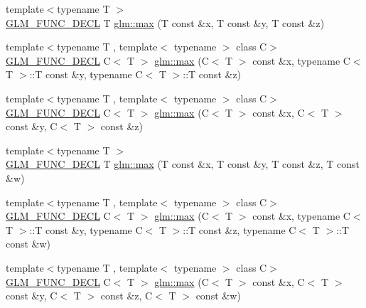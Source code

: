 \begin{DoxyCompactItemize}
\item 
{\footnotesize template$<$typename T $>$ }\\\hyperlink{setup_8hpp_ab2d052de21a70539923e9bcbf6e83a51}{G\+L\+M\+\_\+\+F\+U\+N\+C\+\_\+\+D\+E\+CL} T \hyperlink{group__gtx__extented__min__max_ga04991ccb9865c4c4e58488cfb209ce69}{glm\+::max} (T const \&x, T const \&y, T const \&z)
\item 
{\footnotesize template$<$typename T , template$<$ typename $>$ class C$>$ }\\\hyperlink{setup_8hpp_ab2d052de21a70539923e9bcbf6e83a51}{G\+L\+M\+\_\+\+F\+U\+N\+C\+\_\+\+D\+E\+CL} C$<$ T $>$ \hyperlink{group__gtx__extented__min__max_gae1b7bbe5c91de4924835ea3e14530744}{glm\+::max} (C$<$ T $>$ const \&x, typename C$<$ T $>$\+::T const \&y, typename C$<$ T $>$\+::T const \&z)
\item 
{\footnotesize template$<$typename T , template$<$ typename $>$ class C$>$ }\\\hyperlink{setup_8hpp_ab2d052de21a70539923e9bcbf6e83a51}{G\+L\+M\+\_\+\+F\+U\+N\+C\+\_\+\+D\+E\+CL} C$<$ T $>$ \hyperlink{group__gtx__extented__min__max_gaf832e9d4ab4826b2dda2fda25935a3a4}{glm\+::max} (C$<$ T $>$ const \&x, C$<$ T $>$ const \&y, C$<$ T $>$ const \&z)
\item 
{\footnotesize template$<$typename T $>$ }\\\hyperlink{setup_8hpp_ab2d052de21a70539923e9bcbf6e83a51}{G\+L\+M\+\_\+\+F\+U\+N\+C\+\_\+\+D\+E\+CL} T \hyperlink{group__gtx__extented__min__max_ga78e04a0cef1c4863fcae1a2130500d87}{glm\+::max} (T const \&x, T const \&y, T const \&z, T const \&w)
\item 
{\footnotesize template$<$typename T , template$<$ typename $>$ class C$>$ }\\\hyperlink{setup_8hpp_ab2d052de21a70539923e9bcbf6e83a51}{G\+L\+M\+\_\+\+F\+U\+N\+C\+\_\+\+D\+E\+CL} C$<$ T $>$ \hyperlink{group__gtx__extented__min__max_ga7cca8b53cfda402040494cdf40fbdf4a}{glm\+::max} (C$<$ T $>$ const \&x, typename C$<$ T $>$\+::T const \&y, typename C$<$ T $>$\+::T const \&z, typename C$<$ T $>$\+::T const \&w)
\item 
{\footnotesize template$<$typename T , template$<$ typename $>$ class C$>$ }\\\hyperlink{setup_8hpp_ab2d052de21a70539923e9bcbf6e83a51}{G\+L\+M\+\_\+\+F\+U\+N\+C\+\_\+\+D\+E\+CL} C$<$ T $>$ \hyperlink{group__gtx__extented__min__max_gaacffbc466c2d08c140b181e7fd8a4858}{glm\+::max} (C$<$ T $>$ const \&x, C$<$ T $>$ const \&y, C$<$ T $>$ const \&z, C$<$ T $>$ const \&w)
\end{DoxyCompactItemize}


